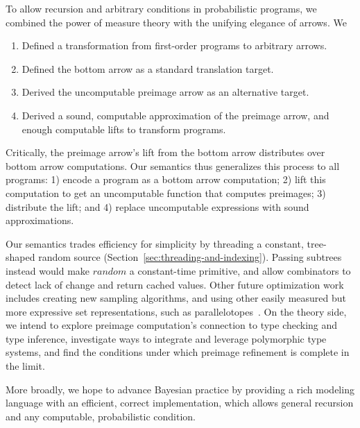 \documentclass{llncs}
\begin{document}
To allow recursion and arbitrary conditions in probabilistic programs, we combined the power of measure theory with the unifying elegance of arrows. We
\begin{enumerate}
	\item Defined a transformation from first-order programs to arbitrary arrows.
	\item Defined the bottom arrow as a standard translation target.
	\item Derived the uncomputable preimage arrow as an alternative target.
	\item Derived a sound, computable approximation of the preimage arrow, and enough computable lifts to transform programs.
\end{enumerate}
Critically, the preimage arrow's lift from the bottom arrow distributes over bottom arrow computations.
Our semantics thus generalizes this process to all programs: 1) encode a program as a bottom arrow computation; 2) lift this computation to get an uncomputable function that computes preimages; 3) distribute the lift; and 4) replace uncomputable expressions with sound approximations.

Our semantics trades efficiency for simplicity by threading a constant, tree-shaped random source (Section~\ref{sec:threading-and-indexing}).
Passing subtrees instead would make $random$ a constant-time primitive, and allow combinators to detect lack of change and return cached values.
Other future optimization work includes creating new sampling algorithms, and using other easily measured but more expressive set representations, such as parallelotopes~\cite{cit:amato-2012tcs-parallelotopes}.
On the theory side, we intend to explore preimage computation's connection to type checking and type inference, investigate ways to integrate and leverage polymorphic type systems, and find the conditions under which preimage refinement is complete in the limit.

More broadly, we hope to advance Bayesian practice by providing a rich modeling language with an efficient, correct implementation, which allows general recursion and any computable, probabilistic condition.





\end{document}
